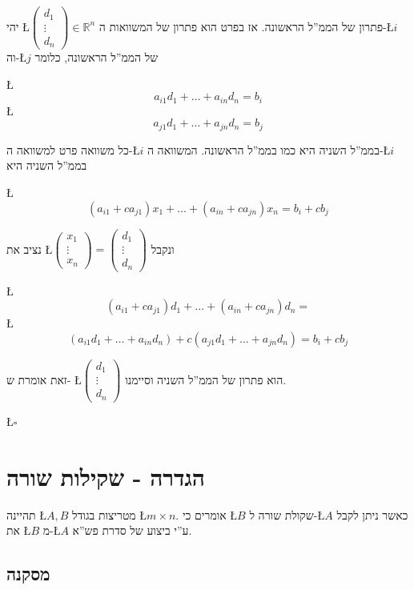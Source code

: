 \documentclass[english,hebrew]{article}
\begin{document}
יהי \L{$\begin{pmatrix}d_{1}\\
\vdots\\
d_{n}
\end{pmatrix}\in\mathbb{R}^{n}$} פתרון של הממ\textquotedblright ל הראשונה. אז בפרט הוא פתרון של המשוואות
ה-\L{$i$} וה-\L{$j$} של הממ\textquotedblright ל הראשונה, כלומר

\L{%
\[
a_{i1}d_{1}+\dots+a_{in}d_{n}=b_{i}
\]
}%
\L{%
\[
a_{j1}d_{1}+\dots+a_{jn}d_{n}=b_{j}
\]
}%

כל משוואה פרט למשוואה ה-\L{$i$} בממ\textquotedblright ל השניה היא
כמו בממ\textquotedblright ל הראשונה. המשוואה ה-\L{$i$} בממ\textquotedblright ל
השניה היא

\L{%
\[
(a_{i1}+ca_{j1})x_{1}+...+(a_{in}+ca_{jn})x_{n}=b_{i}+cb_{j}
\]
}%

נציב את \L{$\begin{pmatrix}x_{1}\\
\vdots\\
x_{n}
\end{pmatrix}=\begin{pmatrix}d_{1}\\
\vdots\\
d_{n}
\end{pmatrix}$} ונקבל

\L{%
\[
(a_{i1}+ca_{j1})d_{1}+\dots+(a_{in}+ca_{jn})d_{n}=
\]
}%
\L{%
\[
(a_{i1}d_{1}+\dots+a_{in}d_{n})+c(a_{j1}d_{1}+\dots+a_{jn}d_{n})=b_{i}+cb_{j}
\]
}%

זאת אומרת ש- \L{$\begin{pmatrix}d_{1}\\
\vdots\\
d_{n}
\end{pmatrix}$} הוא פתרון של הממ\textquotedblright ל השניה וסיימנו.
\begin{flushright}
\L{$\square$}
\par\end{flushright}

\section{הגדרה - שקילות שורה}

תהיינה \L{$A,B$} מטריצות בגודל \L{$m\times n$}. אומרים כי \L{$B$}
שקולת שורה ל-\L{$A$} כאשר ניתן לקבל את \L{$B$} מ-\L{$A$} ע\textquotedblright י
ביצוע של סדרת פש\textquotedblright א.

\subsection{מסקנה}
\end{document}
